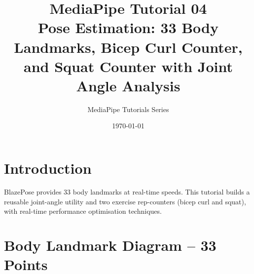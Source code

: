 \documentclass[12pt,a4paper]{article}
\begin{document}
\title{\textbf{\textcolor{mpblue}{MediaPipe Tutorial 04}}\\[0.4em]
    \large Pose Estimation: 33 Body Landmarks, Bicep Curl Counter,\\
    and Squat Counter with Joint Angle Analysis}
\author{MediaPipe Tutorials Series}
\date{\today}
\maketitle
\tableofcontents
\newpage

\section{Introduction}

BlazePose provides 33 body landmarks at real-time speeds. This tutorial builds a reusable
joint-angle utility and two exercise rep-counters (bicep curl and squat), with real-time
performance optimisation techniques.

\section{Body Landmark Diagram -- 33 Points}

\bigskip
\end{document}
